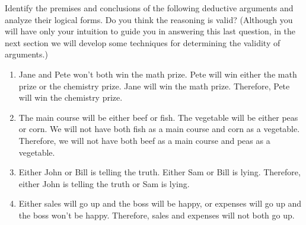 Identify the premises and conclusions of the following deductive arguments and analyze their logical forms. Do you think the reasoning is valid? (Although you will have only your intuition to guide you in answering this last question, in the next section we will develop some techniques for determining the validity of arguments.)

\begin{enumerate}[label=(\alph*)]
    \item Jane and Pete won't both win the math prize. Pete will win either the math prize or the chemistry prize. Jane will win the math prize. Therefore, Pete will win the chemistry prize.
    \item The main course will be either beef or fish. The vegetable will be either peas or corn. We will not have both fish as a main course and corn as a vegetable. Therefore, we will not have both beef as a main course and peas as a vegetable.
    \item Either John or Bill is telling the truth. Either Sam or Bill is lying. Therefore, either John is telling the truth or Sam is lying.
    \item Either sales will go up and the boss will be happy, or expenses will go up and the boss won't be happy. Therefore, sales and expenses will not both go up.
\end{enumerate} 

